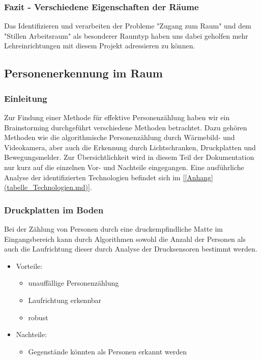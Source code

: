 \subsubsection{Fazit - Verschiedene Eigenschaften der Räume}
\label{sec:Fazit - Verschiedene Eigenschaften der Räume}

Das Identifizieren und verarbeiten der Probleme "Zugang zum Raum" und dem
"Stillen Arbeitsraum" als besonderer Raumtyp haben uns dabei geholfen mehr
Lehreinrichtungen mit diesem Projekt adressieren zu können.


\subsection{Personenerkennung im Raum}
\label{sec:Personenerkennung im Raum}

\subsubsection{Einleitung}
\label{sec:Personenerkennung im Raum Einleitung}

Zur Findung einer Methode für effektive Personenzählung haben wir ein
Brainstorming durchgeführt verschiedene Methoden betrachtet. Dazu gehören 
Methoden wie die algorithmische Personenzählung
durch Wärmebild- und Videokamera, aber auch die Erkennung durch Lichtschranken,
Druckplatten und Bewegungsmelder.
Zur Übersichtlichkeit wird in diesem Teil der Dokumentation nur kurz auf die
einzelnen Vor- und Nachteile eingegangen. Eine ausführliche Analyse der
identifizierten Technologien befindet sich im \ref{[Anhang](tabelle_Technologien.md)}.

\subsubsection{Druckplatten im Boden}
\label{sec:Druckplatten im Boden}

Bei der Zählung von Personen durch eine druckempfindliche Matte im
Eingangsbereich kann durch Algorithmen sowohl die Anzahl der Personen als auch
die Laufrichtung dieser durch Analyse der Drucksensoren bestimmt werden.

\begin{itemize}
	\item Vorteile:
	\begin{itemize}
		\item unauffällige Personenzählung
		\item Laufrichtung erkennbar
		\item robust
	\end{itemize}
	\item Nachteile:
	\begin{itemize}
		\item Gegenstände könnten als Personen erkannt werden
	\end{itemize}
\end{itemize}


